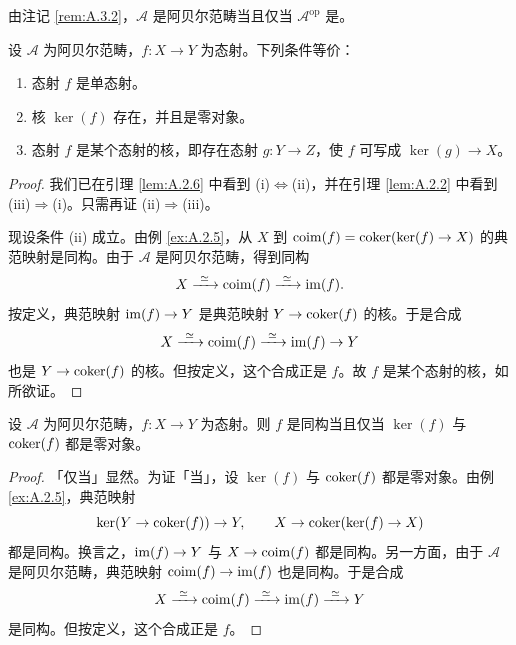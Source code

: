 \begin{remark}\label{rem:A.3.6}
由注记 \ref{rem:A.3.2}，$\mathcal{A}$ 是阿贝尔范畴当且仅当 $\mathcal{A}^{\mathrm{op}}$ 是。
\end{remark}

\begin{lemma}\label{lem:A.3.7}
设 $\mathcal{A}$ 为阿贝尔范畴，$f:X\to Y$ 为态射。下列条件等价：
\begin{enumerate}[label=(\roman*),leftmargin=2em,itemsep=0.25ex]
  \item 态射 $f$ 是单态射。
  \item 核 $\ker(f)$ 存在，并且是零对象。
  \item 态射 $f$ 是某个态射的核，即存在态射 $g:Y\to Z$，使 $f$ 可写成 $\ker(g)\to X$。
\end{enumerate}
\end{lemma}

\begin{proof}
我们已在引理 \ref{lem:A.2.6} 中看到 (i)$\Leftrightarrow$(ii)，并在引理 \ref{lem:A.2.2} 中看到 (iii)$\Rightarrow$(i)。只需再证 (ii)$\Rightarrow$(iii)。

现设条件 (ii) 成立。由例 \ref{ex:A.2.5}，从 $X$ 到 $\operatorname{coim}(f)=\operatorname{coker}(\ker(f)\to X)$ 的典范映射是同构。由于 $\mathcal{A}$ 是阿贝尔范畴，得到同构
\[
X\xrightarrow{\ \simeq\ }\coim(f)\xrightarrow{\ \simeq\ }\im(f).
\]
按定义，典范映射 $\operatorname{im}(f)\to Y$ 是典范映射 $Y\to\operatorname{coker}(f)$ 的核。于是合成
\[
X\xrightarrow{\ \simeq\ }\coim(f)\xrightarrow{\ \simeq\ }\im(f)\to Y
\]
也是 $Y\to\operatorname{coker}(f)$ 的核。但按定义，这个合成正是 $f$。故 $f$ 是某个态射的核，如所欲证。
\end{proof}

\begin{proposition}\label{prop:A.3.8}
设 $\mathcal{A}$ 为阿贝尔范畴，$f:X\to Y$ 为态射。则 $f$ 是同构当且仅当 $\ker(f)$ 与 $\operatorname{coker}(f)$ 都是零对象。
\end{proposition}

\begin{proof}
「仅当」显然。为证「当」，设 $\ker(f)$ 与 $\operatorname{coker}(f)$ 都是零对象。由例 \ref{ex:A.2.5}，典范映射
\[
\ker(Y\to\operatorname{coker}(f))\to Y,\qquad X\to\operatorname{coker}(\ker(f)\to X)
\]
都是同构。换言之，$\operatorname{im}(f)\to Y$ 与 $X\to\operatorname{coim}(f)$ 都是同构。另一方面，由于 $\mathcal{A}$ 是阿贝尔范畴，典范映射 $\operatorname{coim}(f)\to\operatorname{im}(f)$ 也是同构。于是合成
\[
X\xrightarrow{\ \simeq\ }\coim(f)\xrightarrow{\ \simeq\ }\im(f)\xrightarrow{\ \simeq\ }Y
\]
是同构。但按定义，这个合成正是 $f$。
\end{proof}

